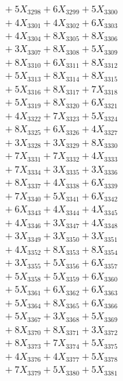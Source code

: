 \documentclass[a4paper,10pt]{article}
\begin{document}
{\begin{align}
&\;  + 5 X_{3298} + 6 X_{3299} + 5 X_{3300} \\[0.3ex]
&\;  + 4 X_{3301} + 4 X_{3302} + 6 X_{3303} \\[0.3ex]
&\;  + 4 X_{3304} + 8 X_{3305} + 8 X_{3306} \\[0.3ex]
&\;  + 3 X_{3307} + 8 X_{3308} + 5 X_{3309} \\[0.5ex]\allowbreak
&\;  + 8 X_{3310} + 6 X_{3311} + 8 X_{3312} \\[0.3ex]
&\;  + 5 X_{3313} + 8 X_{3314} + 8 X_{3315} \\[0.3ex]
&\;  + 5 X_{3316} + 8 X_{3317} + 7 X_{3318} \\[0.3ex]
&\;  + 5 X_{3319} + 8 X_{3320} + 6 X_{3321} \\[0.3ex]
&\;  + 4 X_{3322} + 7 X_{3323} + 5 X_{3324} \\[0.3ex]
&\;  + 8 X_{3325} + 6 X_{3326} + 4 X_{3327} \\[0.3ex]
&\;  + 3 X_{3328} + 3 X_{3329} + 8 X_{3330} \\[0.3ex]
&\;  + 7 X_{3331} + 7 X_{3332} + 4 X_{3333} \\[0.3ex]
&\;  + 7 X_{3334} + 3 X_{3335} + 3 X_{3336} \\[0.3ex]
&\;  + 8 X_{3337} + 4 X_{3338} + 6 X_{3339} \\[0.5ex]\allowbreak
&\;  + 7 X_{3340} + 5 X_{3341} + 6 X_{3342} \\[0.3ex]
&\;  + 6 X_{3343} + 4 X_{3344} + 4 X_{3345} \\[0.3ex]
&\;  + 4 X_{3346} + 3 X_{3347} + 4 X_{3348} \\[0.3ex]
&\;  + 3 X_{3349} + 3 X_{3350} + 3 X_{3351} \\[0.3ex]
&\;  + 4 X_{3352} + 8 X_{3353} + 8 X_{3354} \\[0.3ex]
&\;  + 3 X_{3355} + 5 X_{3356} + 6 X_{3357} \\[0.3ex]
&\;  + 5 X_{3358} + 5 X_{3359} + 6 X_{3360} \\[0.3ex]
&\;  + 5 X_{3361} + 6 X_{3362} + 6 X_{3363} \\[0.3ex]
&\;  + 5 X_{3364} + 8 X_{3365} + 6 X_{3366} \\[0.3ex]
&\;  + 5 X_{3367} + 3 X_{3368} + 5 X_{3369} \\[0.5ex]\allowbreak
&\;  + 8 X_{3370} + 8 X_{3371} + 3 X_{3372} \\[0.3ex]
&\;  + 8 X_{3373} + 7 X_{3374} + 5 X_{3375} \\[0.3ex]
&\;  + 4 X_{3376} + 4 X_{3377} + 5 X_{3378} \\[0.3ex]
&\;  + 7 X_{3379} + 5 X_{3380} + 5 X_{3381} \\[0.3ex]

\end{align}}
\end{document}

